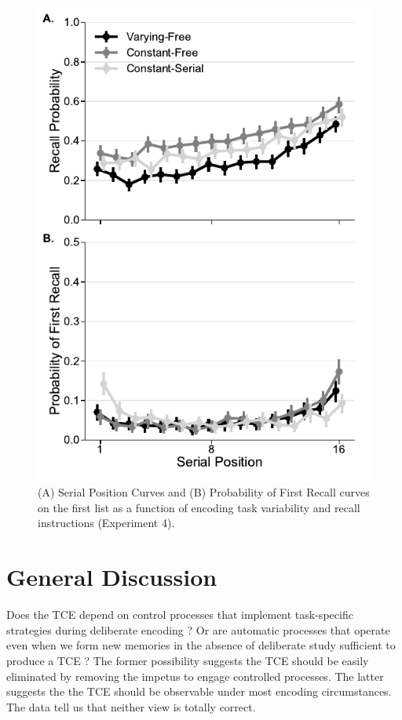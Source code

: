 \documentclass[jou,natbib,floatsintext]{apa6} %
\begin{document}
\begin{figure}
\includegraphics{figures/E4_spc_list1.pdf}
\caption{(A) Serial Position Curves and (B) Probability of First Recall curves on the first list as a function of encoding task variability and recall instructions (Experiment 4). \spcpaneltext}
\label{e4_l1_spc}
\end{figure}

\color{black}





\section{General Discussion}
Does the TCE depend on control processes that implement task-specific strategies during deliberate encoding \citep{Hint16}? Or are automatic processes that operate even when we form new memories in the absence of deliberate study sufficient to produce a TCE \citep{HealKaha17}? The former possibility suggests the TCE should be easily eliminated by removing the impetus to engage controlled processes. The latter suggests the the TCE should be observable under most encoding circumstances. The data tell us that neither view is totally correct.
\end{document}
